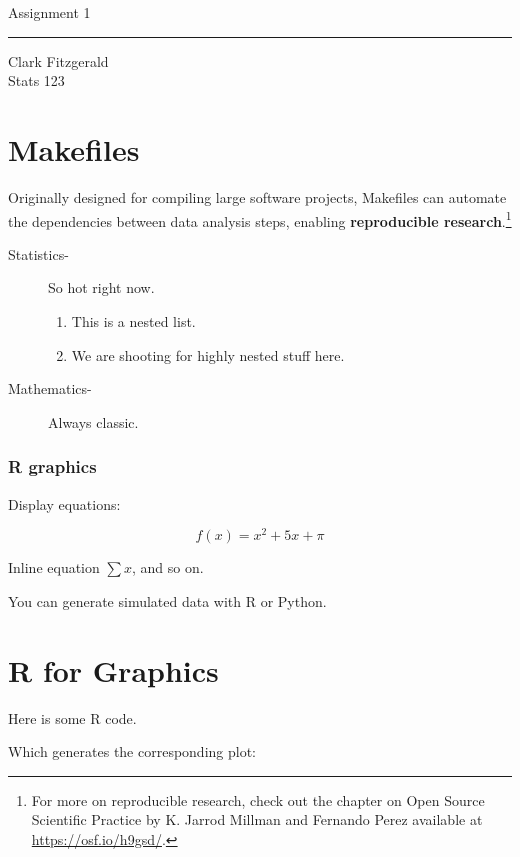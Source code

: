 \documentclass[12pt]{article}
\begin{document}
\begin{center}
    {\Large Assignment 1}\\
    \bigskip
    \hrule
    \medskip
    Clark Fitzgerald\\
    Stats 123
\end{center}

\section*{Makefiles}

Originally designed for compiling large software projects, Makefiles can automate the dependencies between data analysis steps, enabling \textbf{reproducible research}.\footnote{For more on reproducible research, check out the chapter on Open Source Scientific Practice by K. Jarrod Millman and Fernando Perez available at \url{https://osf.io/h9gsd/}.}

\begin{description}
    \item[Statistics-] So hot right now.
    \begin{enumerate}
        \item This is a nested list.
        \item We are shooting for highly nested stuff here.
    \end{enumerate}
    \item[Mathematics-] Always classic.
\end{description}

\vspace{0.3in}

\subsubsection*{R graphics}

Display equations:

\[
    f(x) = x^2 + 5x + \pi
\]

Inline equation $\sum x$, and so on.

You can generate simulated data with R or Python.

\section{R for Graphics}

Here is some R code.

Which generates the corresponding plot:
\end{document}
